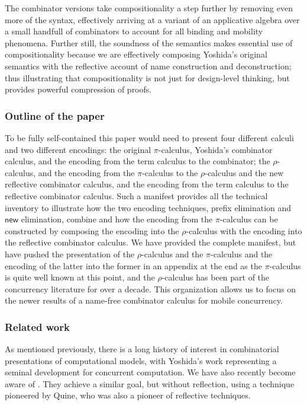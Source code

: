 \documentclass{llncs}
\newcommand{\new}{\mathsf{new}}
\newcommand{\pic}{$\pi$-calculus}
\newcommand{\rhoc}{$\rho$-calculus}
\begin{document}
The combinator versions take compositionality a step further by
removing even more of the syntax, effectively arriving at a variant of
an applicative algebra over a small handfull of combinators to account
for all binding and mobility phenomena. Further still, the soundness
of the semantics makes essential use of compositionality because we
are effectively composing Yoshida's original semantics with the
reflective account of name construction and deconstruction; thus
illustrating that compositionality is not just for design-level
thinking, but provides powerful compression of proofs.

\subsubsection{Outline of the paper}
To be fully self-contained this paper would need to present four
different calculi and two different encodings: the original {\pic},
Yoshida's combinator calculus, and the encoding from the term calculus
to the combinator; the {\rhoc}, and the encoding from the {\pic\;} to
the {\rhoc} and the new reflective combinator calculus, and the
encoding from the term calculus to the reflective combinator
calculus. Such a manifest provides all the technical inventory to
illustrate how the two encoding techniques, prefix elimination and
$\new$ elimination, combine and how the encoding from the {\pic\;} can
be constructed by composing the encoding into the {\rhoc} with the
encoding into the reflective combinator calculus. We have provided the
complete manifest, but have pushed the presentation of the {\rhoc} and
the {\pic\;} and the encoding of the latter into the former in an
appendix at the end as the {\pic\;} is quite well known at this point,
and the {\rhoc} has been part of the concurrency literature for over a
decade. This organization allows us to focus on the newer results of a
name-free combinator calculus for mobile concurrency.

\subsubsection{Related work}

As mentioned previously, there is a long history of interest in
combinatorial presentations of computational models, with Yoshida's
work representing a seminal development for concurrent computation. We
have also recently become aware of
\cite{DBLP:journals/toplas/RajaS97}. They achieve a similar goal, but
without reflection, using a technique pioneered by Quine, who was also
a pioneer of reflective techniques. \cite{Quine59} \cite{Quine60}
\end{document}
